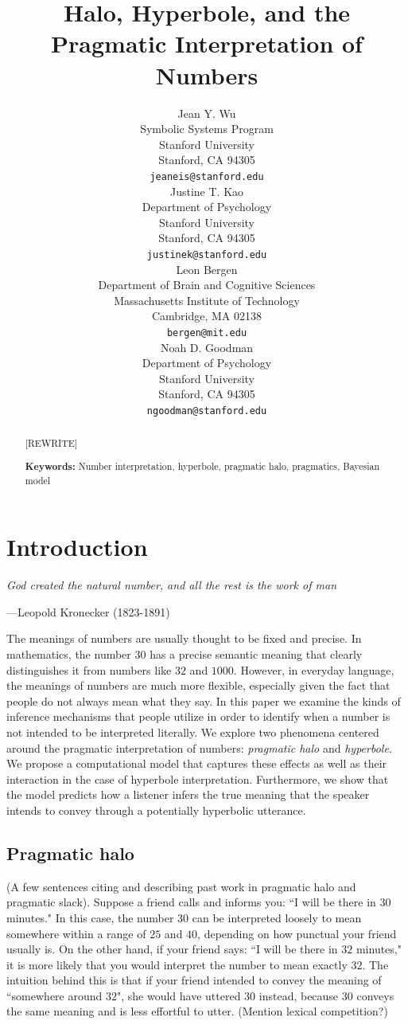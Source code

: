 \documentclass{article} %
\title{Halo, Hyperbole, and the Pragmatic Interpretation of Numbers}
\author{
Jean Y. Wu \\
Symbolic Systems Program\\
Stanford University\\
Stanford, CA 94305 \\
\texttt{jeaneis@stanford.edu} \\
\And
Justine T. Kao \\
Department of Psychology\\
Stanford University \\
Stanford, CA 94305 \\
\texttt{justinek@stanford.edu} \\
\AND
Leon Bergen \\
Department of Brain and Cognitive Sciences\\
Massachusetts Institute of Technology \\
Cambridge, MA 02138\\
\texttt{bergen@mit.edu} \\
\And
Noah D. Goodman \\
Department of Psychology\\
Stanford University \\ 
Stanford, CA 94305\\
\texttt{ngoodman@stanford.edu} \\
}
\begin{document}
\maketitle

\begin{abstract}
[REWRITE] 

\textbf{Keywords:} 
Number interpretation, hyperbole, pragmatic halo, pragmatics, Bayesian model
\end{abstract}


\section{Introduction}

\emph{God created the natural number, and all the rest is the work of man}
 \begin{flushright}
 ---Leopold Kronecker (1823-1891)
 \end{flushright} 

The meanings of numbers are usually thought to be fixed and precise. In mathematics, the number $30$ has a precise semantic meaning that clearly distinguishes it from numbers like $32$ and $1000$. However, in everyday language, the meanings of numbers are much more flexible, especially given the fact that people do not always mean what they say. In this paper we examine the kinds of inference mechanisms that people utilize in order to identify when a number is not intended to be interpreted literally. We explore two phenomena centered around the pragmatic interpretation of numbers: \emph{pragmatic halo} and \emph{hyperbole.} We propose a computational model that captures these effects as well as their interaction in the case of hyperbole interpretation. Furthermore, we show that the model predicts how a listener infers the true meaning that the speaker intends to convey through a potentially hyperbolic utterance. 

\subsection{Pragmatic halo}

(A few sentences citing and describing past work in pragmatic halo and pragmatic slack). Suppose a friend calls and informs you: ``I will be there in $30$ minutes." In this case, the number $30$ can be interpreted loosely to mean somewhere within a range of $25$ and $40$, depending on how punctual your friend usually is. On the other hand, if your friend says: ``I will be there in $32$ minutes," it is more likely that you would interpret the number to mean exactly $32$. The intuition behind this is that if your friend intended to convey the meaning of ``somewhere around $32$", she would have uttered $30$ instead, because $30$ conveys the same meaning and is less effortful to utter. (Mention lexical competition?)
\end{document}
